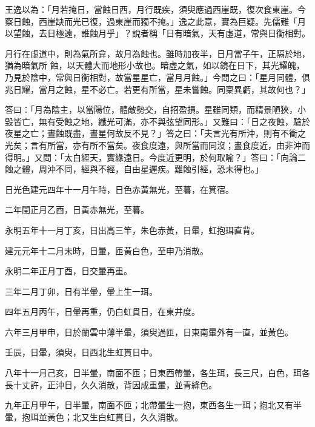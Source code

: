 \begin{pinyinscope}
 王逸以為：「月若掩日，當蝕日西，月行既疾，須臾應過西崖既，復次食東崖。今察日蝕，西崖缺而光已復，過東崖而獨不掩。」逸之此意，實為巨疑。先儒難「月以望蝕，去日極遠，誰蝕月乎」？說者稱「日有暗氣，天有虛道，常與日衡相對。



 月行在虛道中，則為氣所弇，故月為蝕也。雖時加夜半，日月當子午，正隔於地，猶為暗氣所
 蝕，以天體大而地形小故也。暗虛之氣，如以鏡在日下，其光耀魄，乃見於陰中，常與日衡相對，故當星星亡，當月月蝕。」今問之曰：「星月同體，俱兆日耀，當月之蝕，星不必亡。若更有所當，星未嘗蝕。同稟異虧，其故何也？」



 答曰：「月為陰主，以當陽位，體敵勢交，自招盈損。星雖同類，而精景陋狹，小毀皆亡，無有受蝕之地，纖光可滿，亦不與弦望同形。」又難曰：「日之夜蝕，驗於夜星之亡；晝蝕既盡，晝星何故反不見？」答之曰：「夫言光有所沖，則有不衝之光矣；言有所當，亦有所不當矣。夜食度遠，與所當而同沒；晝食度近，由非沖而得明。」又問：「太白經天，實緣遠日。今度近更明，於何取喻？」答曰：「向論二蝕之體，周沖不同，經與不經，自由星遲疾。難蝕引經，恐未得也。」



 日光色建元四年十一月午時，日色赤黃無光，至暮，在箕宿。



 二年閏正月乙酉，日黃赤無光，至暮。



 永明五年十一月丁亥，日出高三竿，朱色赤黃，日暈，虹抱珥直背。



 建元元年十二月未時，日暈，匝黃白色，至申乃消散。



 永明二年正月丁酉，日交暈再重。



 三年二月丁卯，日有半暈，暈上生一珥。



 四年五月丙午，日暈再重，仍白虹貫日，在東井度。



 六年三月甲申，日於蘭雲中薄半暈，須臾過匝，日東南暈外有一直，並黃色。



 壬辰，日暈，須臾，日西北生虹貫日中。



 八年十一月己亥，日半暈，南面不匝；日東西帶暈，各生珥，長三尺，白色，珥各長十丈許，正沖日，久久消散，背因成重暈，並青絳色。



 九年正月甲午，日半暈，南面不匝；北帶暈生一抱，東西各生一珥；抱北又有半暈，抱珥並黃色；北又生白虹貫日，久久消散。




\end{pinyinscope}
